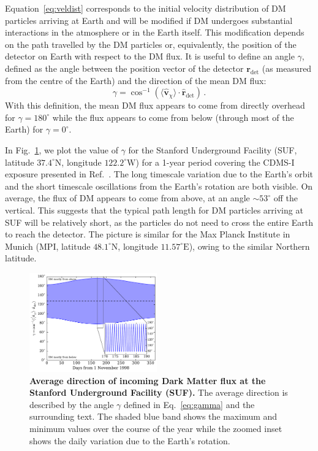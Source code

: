 \documentclass[prd,twocolumn,showpacs,nofootinbib,aps]{revtex4-1}
\begin{document}
Equation~\eqref{eq:veldist} corresponds to the initial velocity distribution of DM particles arriving at Earth and will be modified if DM undergoes substantial interactions in the atmosphere or in the Earth itself. This modification depends on the path travelled by the DM particles or, equivalently, the position of the detector on Earth with respect to the DM flux. It is useful to define an angle $\gamma$, defined as the angle between the position vector of the detector $\mathbf{r}_\mathrm{det}$ (as measured from the centre of the Earth) and the direction of the mean DM flux:
\begin{equation}
\label{eq:gamma}
\gamma = \cos^{-1}\left(\langle \hat{\mathbf{v}}_\chi\rangle \cdot \hat{\mathbf{r}}_\mathrm{det}\right)\,.
\end{equation}
With this definition, the mean DM flux appears to come from directly overhead for $\gamma = 180^\circ$ while the flux appears to come from below (through most of the Earth) for $\gamma = 0^\circ$. 

In Fig.~\ref{fig:gamma}, we plot the value of $\gamma$ for the Stanford Underground Facility (SUF, latitude $37.4^\circ \mathrm{N}$, longitude $122.2^\circ \mathrm{W}$) for a 1-year period covering the CDMS-I exposure presented in Ref.~\cite{Abusaidi:2000wg,Abrams:2002nb}. The long timescale variation due to the Earth's orbit and the short timescale oscillations from the Earth's rotation are both visible. On average, the flux of DM appears to come from above, at an angle $\sim 53^\circ$ off the vertical. This suggests that the typical path length for DM particles arriving at SUF will be relatively short, as the particles do not need to cross the entire Earth to reach the detector. The picture is similar for the Max Planck Institute in Munich (MPI, latitude $48.1^\circ \mathrm{N}$, longitude $11.57^\circ \mathrm{E}$), owing to the similar Northern latitude.

\begin{figure}[t]
\centering
\includegraphics[width=0.49\textwidth,]{plots/Gamma_SUF.pdf}
\caption{\textbf{Average direction of incoming Dark Matter flux at the Stanford Underground Facility (SUF).}  The average direction is described by the angle $\gamma$ defined in Eq.~\eqref{eq:gamma} and the surrounding text. The shaded blue band shows the maximum and minimum values over the course of the year while the zoomed inset shows the daily variation due to the Earth's rotation.}
\label{fig:gamma}
\end{figure}
\end{document}
